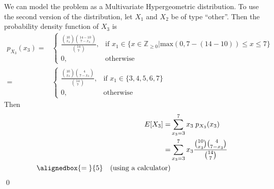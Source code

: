 \documentclass{mthe353answer}
\begin{document}
\begin{questions}
  \setcounter{question}{2}
  \question{}
  We can model the problem as a Multivariate Hypergeometric distribution. To use
  the second version of the distribution, let \(X_1\) and \(X_2\) be of type
  ``other''. Then the probability density function of \(X_3\) is
  \begin{align*}
    p_{X_3}(x_3) =&
    \begin{cases}
      \frac{\binom{10}{x_3}\binom{14-10}{7-x_3}}{\binom{14}{7}}, & \text{if } x_1 \in \{x\in\mathbb{Z}_{\ge0}|\text{max}(0, 7-(14-10))\le x\le 7\}\\
      0, & \text{otherwise}
    \end{cases}\\
    =&
    \begin{cases}
      \frac{\binom{10}{x_3}\binom{4}{7-x_3}}{\binom{14}{7}}, & \text{if } x_1 \in \{3,4,5,6,7\}\\
      0, & \text{otherwise}
    \end{cases}
  \end{align*}
  Then
  \begin{align*}
    E[X_3] =& \sum_{x_3=3}^{7} x_3\;p_{X_3}(x_3)\\
    =& \sum_{x_3=3}^{7} x_3\frac{\binom{10}{x_3}\binom{4}{7-x_3}}{\binom{14}{7}}\\
    \alignedbox{=\;}{5}\quad \text{(using a calculator)}
  \end{align*}
  \hfill\qed{}
\end{questions}
\end{document}
